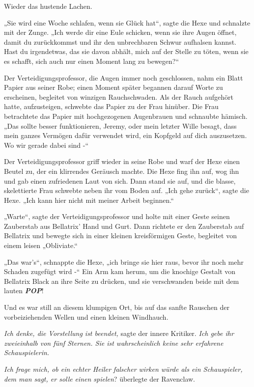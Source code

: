 {Wieder das hustende Lachen.

„Sie wird eine Woche schlafen, wenn sie Glück hat“, sagte die Hexe und schnalzte mit der Zunge. „Ich werde dir eine Eule schicken, wenn sie ihre Augen öffnet, damit du zurückkommst und ihr den unbrechbaren Schwur aufhalsen kannst. Hast du irgendetwas, das sie davon abhält, mich auf der Stelle zu töten, wenn sie es schafft, sich auch nur einen Moment lang zu bewegen?“

Der Verteidigungsprofessor, die Augen immer noch geschlossen, nahm ein Blatt Papier aus seiner Robe; einen Moment später begannen darauf Worte zu erscheinen, begleitet von winzigen Rauchschwaden. Als der Rauch aufgehört hatte, aufzusteigen, schwebte das Papier zu der Frau hinüber. Die Frau betrachtete das Papier mit hochgezogenen Augenbrauen und schnaubte hämisch. „Das sollte besser funktionieren, Jeremy, oder mein letzter Wille besagt, dass mein ganzes Vermögen dafür verwendet wird, ein Kopfgeld auf dich auszusetzen. Wo wir gerade dabei sind -“

Der Verteidigungsprofessor griff wieder in seine Robe und warf der Hexe einen Beutel zu, der ein klirrendes Geräusch machte. Die Hexe fing ihn auf, wog ihn und gab einen zufriedenen Laut von sich. Dann stand sie auf, und die blasse, skelettierte Frau schwebte neben ihr vom Boden auf. „Ich gehe zurück“, sagte die Hexe. „Ich kann hier nicht mit meiner Arbeit beginnen.“

„Warte“, sagte der Verteidigungsprofessor und holte mit einer Geste seinen Zauberstab aus Bellatrix' Hand und Gurt. Dann richtete er den Zauberstab auf Bellatrix und bewegte sich in einer kleinen kreisförmigen Geste, begleitet von einem leisen „Obliviate.“

„Das war's“, schnappte die Hexe, „ich bringe sie hier raus, bevor ihr noch mehr Schaden zugefügt wird -“ Ein Arm kam herum, um die knochige Gestalt von Bellatrix Black an ihre Seite zu drücken, und sie verschwanden beide mit dem lauten \textbf{\emph{POP}}!

Und es war still an diesem klumpigen Ort, bis auf das sanfte Rauschen der vorbeiziehenden Wellen und einen kleinen Windhauch.

\emph{Ich denke, die Vorstellung ist beendet,} sagte der innere Kritiker. \emph{Ich gebe ihr zweieinhalb von fünf Sternen. Sie ist wahrscheinlich keine sehr erfahrene Schauspielerin.}

\emph{Ich frage mich, ob ein echter Heiler falscher wirken würde als ein Schauspieler, dem man sagt, er solle} \emph{einen spielen}? überlegte der Ravenclaw.

}
